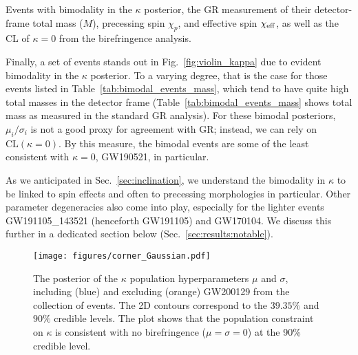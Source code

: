 \documentclass[aps,prd,twocolumn,superscriptaddress,preprintnumbers,nofootinbib]{revtex4-2}
\begin{document}
\begin{table}
    \caption{Events with bimodality in the $\kappa$ posterior, the \ac{GR} measurement of their detector-frame total mass ($M$), precessing spin $\chi_p$, and effective spin $\chi_{\rm eff}$, as well as the CL of $\kappa = 0$ from the birefringence analysis.}
    \begin{ruledtabular}
    \end{ruledtabular}
    \label{tab:bimodal_events_mass}
\end{table}

Finally, a set of events stands out in Fig.~\ref{fig:violin_kappa} due to evident bimodality in the $\kappa$ posterior.
To a varying degree, that is the case for those events listed in Table~\ref{tab:bimodal_events_mass}, which tend to have quite high total masses in the detector frame (Table~\ref{tab:bimodal_events_mass} shows total mass as measured in the standard \ac{GR} analysis).
For these bimodal posteriors, $\mu_i/\sigma_i$ is not a good proxy for agreement with \ac{GR}; instead, we can rely on $\mathrm{CL}(\kappa = 0)$.
By this measure, the bimodal events are some of the least consistent with $\kappa = 0$, GW190521, in particular.

As we anticipated in Sec.~\ref{sec:inclination}, we understand the bimodality in $\kappa$ to be linked to spin effects and often to precessing morphologies in particular.
Other parameter degeneracies also come into play, especially for the lighter events GW191105\_143521 (henceforth GW191105) and GW170104.
We discuss this further in a dedicated section below (Sec.~\ref{sec:results:notable}).

\begin{figure}
    \texttt{[image: figures/corner\_Gaussian.pdf]}
    \caption{
        The posterior of the $\kappa$ population hyperparameters $\mu$ and $\sigma$, including (blue) and excluding (orange) GW200129 from the collection of events.
        The \ac{2D} contours correspond to the $39.35\%$ and $90\%$ credible levels.
        The plot shows that the population constraint on $\kappa$ is consistent with no birefringence ($\mu=\sigma=0$) at the 90\% credible level.
    }
    \label{fig:corner_Gaussian}
\end{figure}
\end{document}
